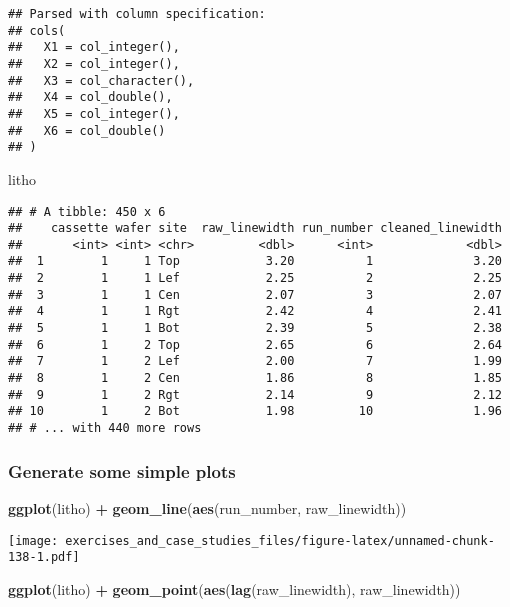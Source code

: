 \documentclass[]{book}
\newenvironment{Shaded}{\begin{snugshade}}{\end{snugshade}}
\newcommand{\KeywordTok}[1]{\textcolor[rgb]{0.13,0.29,0.53}{\textbf{#1}}}
\newcommand{\NormalTok}[1]{#1}
\newcommand{\OperatorTok}[1]{\textcolor[rgb]{0.81,0.36,0.00}{\textbf{#1}}}
\newcommand{\StringTok}[1]{\textcolor[rgb]{0.31,0.60,0.02}{#1}}
\theoremstyle{definition}
\theoremstyle{definition}
\theoremstyle{definition}
\theoremstyle{remark}
\begin{document}
\begin{verbatim}
## Parsed with column specification:
## cols(
##   X1 = col_integer(),
##   X2 = col_integer(),
##   X3 = col_character(),
##   X4 = col_double(),
##   X5 = col_integer(),
##   X6 = col_double()
## )
\end{verbatim}

\begin{Shaded}
\begin{Highlighting}[]
\NormalTok{litho}
\end{Highlighting}
\end{Shaded}

\begin{verbatim}
## # A tibble: 450 x 6
##    cassette wafer site  raw_linewidth run_number cleaned_linewidth
##       <int> <int> <chr>         <dbl>      <int>             <dbl>
##  1        1     1 Top            3.20          1              3.20
##  2        1     1 Lef            2.25          2              2.25
##  3        1     1 Cen            2.07          3              2.07
##  4        1     1 Rgt            2.42          4              2.41
##  5        1     1 Bot            2.39          5              2.38
##  6        1     2 Top            2.65          6              2.64
##  7        1     2 Lef            2.00          7              1.99
##  8        1     2 Cen            1.86          8              1.85
##  9        1     2 Rgt            2.14          9              2.12
## 10        1     2 Bot            1.98         10              1.96
## # ... with 440 more rows
\end{verbatim}

\hypertarget{generate-some-simple-plots}{%
\subsubsection{Generate some simple
plots}\label{generate-some-simple-plots}}

\begin{Shaded}
\begin{Highlighting}[]
\KeywordTok{ggplot}\NormalTok{(litho) }\OperatorTok{+}
\StringTok{  }\KeywordTok{geom_line}\NormalTok{(}\KeywordTok{aes}\NormalTok{(run_number, raw_linewidth))}
\end{Highlighting}
\end{Shaded}

\texttt{[image: exercises\_and\_case\_studies\_files/figure-latex/unnamed-chunk-138-1.pdf]}

\begin{Shaded}
\begin{Highlighting}[]
\KeywordTok{ggplot}\NormalTok{(litho) }\OperatorTok{+}
\StringTok{  }\KeywordTok{geom_point}\NormalTok{(}\KeywordTok{aes}\NormalTok{(}\KeywordTok{lag}\NormalTok{(raw_linewidth), raw_linewidth))}
\end{Highlighting}
\end{Shaded}
\end{document}
